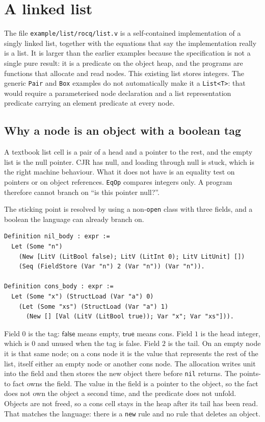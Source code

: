 \documentclass[11pt]{article}
\newcommand{\cjr}{CJR}
\newcommand{\True}{\mathsf{true}}
\newcommand{\False}{\mathsf{false}}
\begin{document}


\section{A linked list}

The file \texttt{example/list/rocq/list.v} is a self-contained implementation of a singly linked list, together with the equations that say the implementation really is a list.
It is larger than the earlier examples because the specification is not a single pure result: it is a predicate on the object heap, and the programs are functions that allocate and read nodes.
This existing list stores integers. The generic \texttt{Pair} and
\texttt{Box} examples do not automatically make it a \texttt{List<T>}:
that would require a parameterised node declaration and a list
representation predicate carrying an element predicate at every node.

\subsection{Why a node is an object with a boolean tag}

A textbook list cell is a pair of a head and a pointer to the rest, and the empty list is the null pointer.
\cjr{} has null, and loading through null is stuck, which is the right machine behaviour.
What it does not have is an equality test on pointers or on object references.
\texttt{EqOp} compares integers only.
A program therefore cannot branch on ``is this pointer null?''.

The sticking point is resolved by using a non-\texttt{open} class with three fields, and a boolean the language can already branch on.

\begin{lstlisting}
Definition nil_body : expr :=
  Let (Some "n")
    (New [LitV (LitBool false); LitV (LitInt 0); LitV LitUnit] [])
    (Seq (FieldStore (Var "n") 2 (Var "n")) (Var "n")).

Definition cons_body : expr :=
  Let (Some "x") (StructLoad (Var "a") 0)
    (Let (Some "xs") (StructLoad (Var "a") 1)
      (New [] [Val (LitV (LitBool true)); Var "x"; Var "xs"])).
\end{lstlisting}

Field \(0\) is the tag: \(\False\) means empty, \(\True\) means cons.
Field \(1\) is the head integer, which is \(0\) and unused when the tag is false.
Field \(2\) is the tail.
On an empty node it is that same node; on a cons node it is the value that represents the rest of the list, itself either an empty node or another cons node.
The allocation writes unit into the field and then stores the new object there before \texttt{nil} returns.
The points-to fact owns the field.
The value in the field is a pointer to the object, so the fact does not own the object a second time, and the predicate does not unfold.
Objects are not freed, so a cons cell stays in the heap after its tail has been read.
That matches the language: there is a \texttt{new} rule and no rule that deletes an object.
\end{document}
